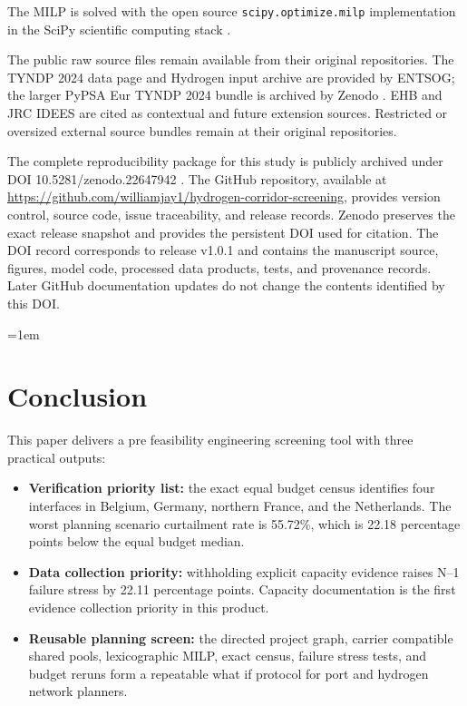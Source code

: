 \documentclass{ieeeaccess}
\begin{document}
The MILP is solved with the open source \texttt{scipy.optimize.milp} implementation in the SciPy scientific computing stack \cite{Virtanen2020}.

The public raw source files remain available from their original repositories. The TYNDP 2024 data page and Hydrogen input archive are provided by ENTSOG; the larger PyPSA Eur TYNDP 2024 bundle is archived by Zenodo \cite{TYNDPZenodo}. EHB and JRC IDEES are cited as contextual and future extension sources. Restricted or oversized external source bundles remain at their original repositories.

The complete reproducibility package for this study is publicly archived under DOI 10.5281/zenodo.22647942 \cite{HydrogenScreeningZenodo}. The GitHub repository, available at \url{https://github.com/williamjay1/hydrogen-corridor-screening}, provides version control, source code, issue traceability, and release records. Zenodo preserves the exact release snapshot and provides the persistent DOI used for citation. The DOI record corresponds to release v1.0.1 and contains the manuscript source, figures, model code, processed data products, tests, and provenance records. Later GitHub documentation updates do not change the contents identified by this DOI.

\emergencystretch=1em

\section{Conclusion}
\label{sec:conclusion}

This paper delivers a pre feasibility engineering screening tool with three practical outputs:
\begin{itemize}
\item \textbf{Verification priority list:} the exact equal budget census identifies four interfaces in Belgium, Germany, northern France, and the Netherlands. The worst planning scenario curtailment rate is 55.72\%, which is 22.18 percentage points below the equal budget median.
\item \textbf{Data collection priority:} withholding explicit capacity evidence raises N--1 failure stress by 22.11 percentage points. Capacity documentation is the first evidence collection priority in this product.
\item \textbf{Reusable planning screen:} the directed project graph, carrier compatible shared pools, lexicographic MILP, exact census, failure stress tests, and budget reruns form a repeatable what if protocol for port and hydrogen network planners.
\end{itemize}
\end{document}
